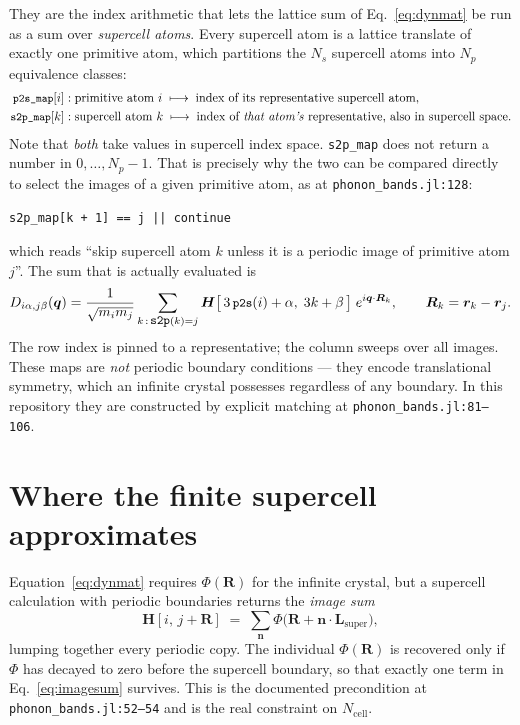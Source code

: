 \documentclass[11pt]{article}
\newcommand{\code}[1]{\texttt{\small #1}}
\newcommand{\file}[1]{\texttt{\footnotesize #1}}
\begin{document}
They are the index arithmetic that lets the lattice sum of
Eq.~\eqref{eq:dynmat} be run as a sum over \emph{supercell atoms}. Every
supercell atom is a lattice translate of exactly one primitive atom, which
partitions the $N_s$ supercell atoms into $N_p$ equivalence classes:
%
\begin{align}
\code{p2s\_map}[i] &: \text{primitive atom } i \;\longmapsto\;
  \text{index of its representative supercell atom},\\
\code{s2p\_map}[k] &: \text{supercell atom } k \;\longmapsto\;
  \text{index of \emph{that atom's} representative, also in supercell space.}
\end{align}
%
Note that \emph{both} take values in supercell index space. \code{s2p\_map} does
not return a number in $0,\dots,N_p-1$. That is precisely why the two can be
compared directly to select the images of a given primitive atom, as at
\file{phonon\_bands.jl:128}:
%
\begin{center}
\code{s2p\_map[k + 1] == j || continue}
\end{center}
%
which reads ``skip supercell atom $k$ unless it is a periodic image of primitive
atom $j$''. The sum that is actually evaluated is
%
\begin{equation}
D_{i\alpha,j\beta}(\bm q)
 = \frac{1}{\sqrt{m_im_j}}
   \sum_{k\,:\,\code{s2p}(k)=j}
   \bm H\big[\,3\,\code{p2s}(i)+\alpha,\; 3k+\beta\,\big]\;
   e^{i\bm q\cdot\bm R_k},
\qquad
\bm R_k = \bm r_k - \bm r_j .
\label{eq:implemented}
\end{equation}
%
The row index is pinned to a representative; the column sweeps over all images.
These maps are \emph{not} periodic boundary conditions --- they encode
translational symmetry, which an infinite crystal possesses regardless of any
boundary. In this repository they are constructed by explicit matching at
\file{phonon\_bands.jl:81--106}.

\section{Where the finite supercell approximates}

Equation~\eqref{eq:dynmat} requires $\Phi(\bm R)$ for the infinite crystal, but a
supercell calculation with periodic boundaries returns the \emph{image sum}
%
\begin{equation}
\bm H[i,\,j+\bm R] \;=\; \sum_{\bm n} \Phi\big(\bm R + \bm n\cdot \bm L_{\mathrm{super}}\big),
\label{eq:imagesum}
\end{equation}
%
lumping together every periodic copy. The individual $\Phi(\bm R)$ is recovered
only if $\Phi$ has decayed to zero before the supercell boundary, so that exactly
one term in Eq.~\eqref{eq:imagesum} survives. This is the documented precondition
at \file{phonon\_bands.jl:52--54} and is the real constraint on
$N_{\mathrm{cell}}$.
\end{document}

